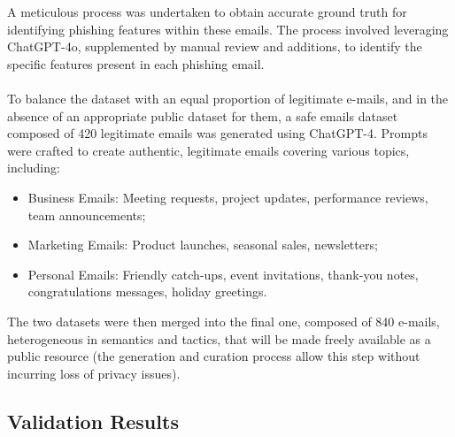 A meticulous process was undertaken to obtain accurate ground truth for identifying phishing features within these emails. The process involved leveraging ChatGPT-4o, supplemented by manual review and additions, to identify the specific features present in each phishing email.
\\ \\
To balance the dataset with an equal proportion of legitimate e-mails, and in the absence of an appropriate public dataset for them, a safe emails dataset composed of 420 legitimate emails was generated using ChatGPT-4. Prompts were crafted to create authentic, legitimate emails covering various topics, including:
\begin{itemize}
    \item Business Emails: Meeting requests, project updates, performance reviews, team announcements;
    \item Marketing Emails: Product launches, seasonal sales, newsletters;
    \item Personal Emails: Friendly catch-ups, event invitations, thank-you notes, congratulations messages, holiday greetings.
\end{itemize}

The two datasets were then merged into the final one, composed of 840 e-mails, heterogeneous in semantics and tactics, that will be made freely available as a public resource (the generation and curation process allow this step without incurring loss of privacy issues).

\subsection{Validation Results}
\label{sec:quantitativevalidation}

